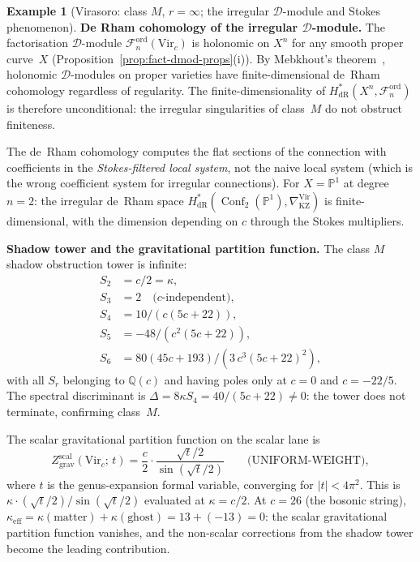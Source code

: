 \documentclass[11pt,reqno]{amsart}
\theoremstyle{definition}
\newtheorem{example}[theorem]{Example}
\theoremstyle{remark}
\newcommand{\cD}{\mathcal{D}}
\newcommand{\cF}{\mathcal{F}}
\DeclareMathOperator{\Conf}{Conf}
\newcommand{\PP}{\mathbb{P}}
\numberwithin{equation}{section}
\begin{document}
\begin{example}[Virasoro: class $M$, $r = \infty$;
the irregular $\cD$-module and Stokes phenomenon]
\medskip
\noindent\textbf{De Rham cohomology of the irregular
$\cD$-module.}
The factorisation $\cD$-module
$\cF_n^{\mathrm{ord}}(\mathrm{Vir}_c)$ is holonomic on
$X^n$ for any smooth proper curve~$X$
(Proposition~\ref{prop:fact-dmod-props}(i)).
By Mebkhout's theorem~\cite{Mebkhout84}, holonomic
$\cD$-modules on proper varieties have finite-dimensional
de~Rham cohomology regardless of regularity.
The finite-dimensionality of
$H^*_{\mathrm{dR}}(X^n, \cF_n^{\mathrm{ord}})$ is
therefore unconditional: the irregular singularities of
class~$M$ do not obstruct finiteness.

The de~Rham cohomology computes the flat sections of the
connection with coefficients in the
\emph{Stokes-filtered local system}, not the naive local
system (which is the wrong coefficient system for irregular
connections). For $X = \PP^1$ at degree $n = 2$: the
irregular de~Rham space
$H^*_{\mathrm{dR}}(\Conf_2(\PP^1), \nabla_{\mathrm{KZ}}^{\mathrm{Vir}})$
is finite-dimensional, with the dimension depending on $c$
through the Stokes multipliers.

\medskip
\noindent\textbf{Shadow tower and the gravitational
partition function.}
The class $M$ shadow obstruction tower is infinite:
\begin{align*}
  S_2 &= c/2 = \kappa,\\
  S_3 &= 2\quad\text{(}c\text{-independent)},\\
  S_4 &= 10/(c(5c+22)),\\
  S_5 &= -48/(c^2(5c+22)),\\
  S_6 &= 80(45c+193)/(3\,c^3(5c+22)^2),
\end{align*}
with all $S_r$ belonging to $\mathbb{Q}(c)$ and having
poles only at $c = 0$ and $c = -22/5$.
The spectral discriminant is $\Delta = 8\kappa S_4
= 40/(5c+22) \neq 0$: the tower does not terminate,
confirming class~$M$.

The scalar gravitational partition function on the
scalar lane is
\begin{equation}\label{eq:vir-Z-grav}
  Z_{\mathrm{grav}}^{\mathrm{scal}}(\mathrm{Vir}_c;\,t)
  = \frac{c}{2}\cdot
  \frac{\sqrt{t}/2}{\sin(\sqrt{t}/2)}
  \qquad\text{(UNIFORM-WEIGHT)},
\end{equation}
where $t$ is the genus-expansion formal variable,
converging for $|t| < 4\pi^2$.
This is $\kappa \cdot (\sqrt{t}/2)/\sin(\sqrt{t}/2)$
evaluated at $\kappa = c/2$.
At $c = 26$ (the bosonic string),
$\kappa_{\mathrm{eff}} = \kappa(\text{matter})
+ \kappa(\text{ghost}) = 13 + (-13) = 0$:
the scalar gravitational partition function vanishes, and
the non-scalar corrections from the shadow tower
become the leading contribution.


\end{example}
\end{document}
